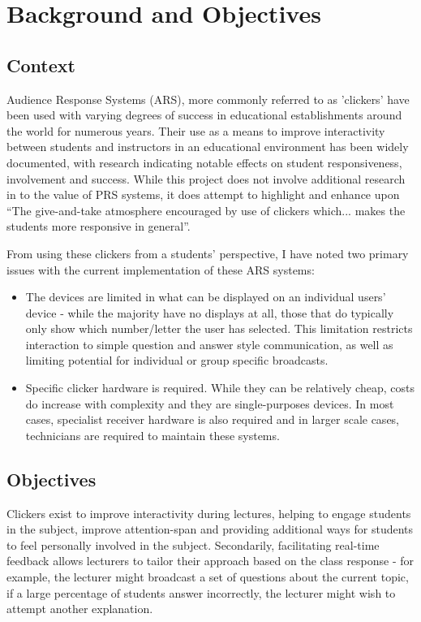 \documentclass[a4papert,11pt,notitlepage]{ltxdoc}
\begin{document}
\pagebreak

\tableofcontents

\pagebreak

\section{Background and Objectives}
\subsection{Context}
Audience Response Systems (ARS), more commonly referred to as 'clickers' have been used with varying degrees of success in educational establishments around the world for numerous years. Their use as a means to improve interactivity between students and instructors in an educational environment has been widely documented, with research indicating notable effects on student responsiveness, involvement and success. While this project does not involve additional research in to the value of PRS systems, it does attempt to highlight and enhance upon ``The give-and-take atmosphere encouraged by use of clickers which... makes the students more responsive in general''\cite{wood:clickers}.

From using these clickers from a students' perspective, I have noted two primary issues with the current implementation of these ARS systems:
\begin{itemize}
\item The devices are limited in what can be displayed on an individual users' device - while the majority have no displays at all, those that do typically only show which number/letter the user has selected. This limitation restricts interaction to simple question and answer style communication, as well as limiting potential for individual or group specific broadcasts.
\item Specific clicker hardware is required. While they can be relatively cheap, costs do increase with complexity and they are single-purposes devices. In most cases, specialist receiver hardware is also required and in larger scale cases, technicians are required to maintain these systems.
\end{itemize}

\subsection{Objectives}
Clickers exist to improve interactivity during lectures, helping to engage students in the subject, improve attention-span and providing additional ways for students to feel personally involved in the subject. Secondarily, facilitating real-time feedback allows lecturers to tailor their approach based on the class response - for example, the lecturer might broadcast a set of questions about the current topic, if a large percentage of students answer incorrectly, the lecturer might wish to attempt another explanation. 
\end{document}
